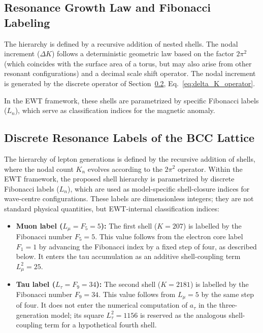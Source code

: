 \documentclass[10pt,a4paper]{article}
\begin{document}
\subsection{Resonance Growth Law and Fibonacci Labeling}
\label{sec:toroidal_logic}

The hierarchy is defined by a recursive addition of nested shells. The nodal increment ($\Delta K$) follows a deterministic geometric law based on the factor $2\pi^2$ (which coincides with the surface area of a torus, but may also arise from other resonant configurations) and a decimal scale shift operator. The nodal increment is generated by the discrete operator of Section~\ref{sec:discrete_resonance_labels}, Eq.~\eqref{eq:delta_K_operator}.

In the EWT framework, these shells are parametrized by specific Fibonacci labels ($L_n$), which serve as classification indices for the magnetic anomaly.

\subsection{Discrete Resonance Labels of the BCC Lattice}
\label{sec:discrete_resonance_labels}

The hierarchy of lepton generations is defined by the recursive addition
of shells, where the nodal count $K_n$ evolves according to the
$2\pi^2$ operator. Within the EWT framework, the proposed shell
hierarchy is parametrized by discrete Fibonacci labels ($L_n$), which
are used as model-specific shell-closure indices for wave-centre
configurations. These labels are dimensionless integers; they are not
standard physical quantities, but EWT-internal classification indices:

\begin{itemize}
	\item \textbf{Muon label ($L_{\mu} = F_5 = 5$):} The first shell
	($K=207$) is labelled by the Fibonacci number $F_5 = 5$. This value
	follows from the electron core label $F_1 = 1$ by advancing the
	Fibonacci index by a fixed step of four, as described below. It
	enters the tau accumulation as an additive shell-coupling term
	$L_\mu^2 = 25$.
	\item \textbf{Tau label ($L_{\tau} = F_9 = 34$):} The second shell
	($K=2181$) is labelled by the Fibonacci number $F_9 = 34$. This
	value follows from $L_\mu = 5$ by the same step of four. It does not
	enter the numerical computation of $a_\tau$ in the three-generation
	model; its square $L_\tau^2 = 1156$ is reserved as the analogous
	shell-coupling term for a hypothetical fourth shell.
\end{itemize}
\end{document}
